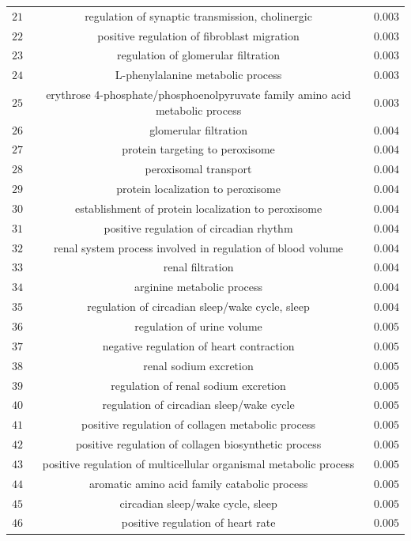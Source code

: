 \documentclass[10pt]{article}
\begin{document}
\begin{table}[!htbp]
{\begin{tabular}{@{\extracolsep{5pt}} ccc}
$21$ & regulation of synaptic transmission, cholinergic & $0.003$ \\ 
$22$ & positive regulation of fibroblast migration & $0.003$ \\ 
$23$ & regulation of glomerular filtration & $0.003$ \\ 
$24$ & L-phenylalanine metabolic process & $0.003$ \\ 
$25$ & erythrose 4-phosphate/phosphoenolpyruvate family amino acid metabolic process & $0.003$ \\ 
$26$ & glomerular filtration & $0.004$ \\ 
$27$ & protein targeting to peroxisome & $0.004$ \\ 
$28$ & peroxisomal transport & $0.004$ \\ 
$29$ & protein localization to peroxisome & $0.004$ \\ 
$30$ & establishment of protein localization to peroxisome & $0.004$ \\ 
$31$ & positive regulation of circadian rhythm & $0.004$ \\ 
$32$ & renal system process involved in regulation of blood volume & $0.004$ \\ 
$33$ & renal filtration & $0.004$ \\ 
$34$ & arginine metabolic process & $0.004$ \\ 
$35$ & regulation of circadian sleep/wake cycle, sleep & $0.004$ \\ 
$36$ & regulation of urine volume & $0.005$ \\ 
$37$ & negative regulation of heart contraction & $0.005$ \\ 
$38$ & renal sodium excretion & $0.005$ \\ 
$39$ & regulation of renal sodium excretion & $0.005$ \\ 
$40$ & regulation of circadian sleep/wake cycle & $0.005$ \\ 
$41$ & positive regulation of collagen metabolic process & $0.005$ \\ 
$42$ & positive regulation of collagen biosynthetic process & $0.005$ \\ 
$43$ & positive regulation of multicellular organismal metabolic process & $0.005$ \\ 
$44$ & aromatic amino acid family catabolic process & $0.005$ \\ 
$45$ & circadian sleep/wake cycle, sleep & $0.005$ \\ 
$46$ & positive regulation of heart rate & $0.005$ \\ 

\end{tabular}}
\end{table}
\end{document}

